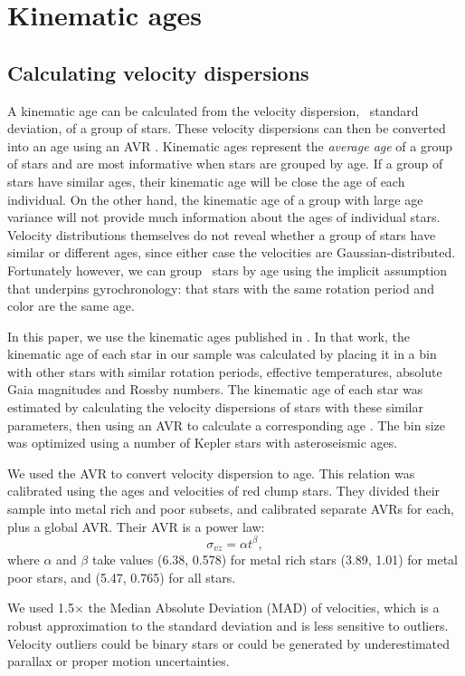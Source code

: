 \section{Kinematic ages}
\subsection{Calculating velocity dispersions}
\label{sec:velocity_dispersion}

A kinematic age can be calculated from the velocity dispersion, \ie\ standard
deviation, of a group of stars.
These velocity dispersions can then be converted into an age using an AVR
\citep[\eg][]{holmberg2009, yu2018}.
Kinematic ages represent the {\it average age} of a group of stars and are
most informative when stars are grouped by age.
If a group of stars have similar ages, their kinematic age will be close
the age of each individual.
On the other hand, the kinematic age of a group with large age variance will
not provide much information about the ages of individual stars.
Velocity distributions themselves do not reveal whether a group of stars have
similar or different ages, since either case the velocities are
Gaussian-distributed.
Fortunately however, we can group \kepler\ stars by age using the implicit
assumption that underpins gyrochronology: that stars with the same rotation
period and color are the same age.

In this paper, we use the kinematic ages published in \citet{lu2021}.
In that work, the kinematic age of each star in our sample was calculated by
placing it in a bin with other stars with similar rotation periods, effective
temperatures, absolute Gaia magnitudes and Rossby numbers.
The kinematic age of each star was estimated by calculating the velocity
dispersions of stars with these similar parameters, then using an AVR to
calculate a corresponding age \citep{yu2019}.
The bin size was optimized using a number of Kepler stars with asteroseismic
ages.

We used the \citet{yu2018} AVR to convert velocity dispersion to age.
This relation was calibrated using the ages and velocities of red clump stars.
They divided their sample into metal rich and poor subsets, and calibrated
separate AVRs for each, plus a global AVR.
Their AVR is a power law:
\begin{equation}
    \sigma_{vz} = \alpha t ^\beta,
\end{equation}
where $\alpha$ and $\beta$ take values (6.38, 0.578) for metal rich stars
(3.89, 1.01) for metal poor stars, and (5.47, 0.765) for all stars.

We used 1.5$\times$ the Median Absolute Deviation (MAD) of velocities, which
is a robust approximation to the standard deviation and is less sensitive to
outliers.
Velocity outliers could be binary stars or could be generated by
underestimated parallax or proper motion uncertainties.
